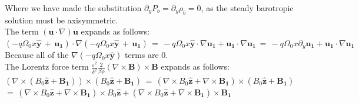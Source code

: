 \documentclass[letterpaper,12pt]{article}
\begin{document}
Where we have made the substitution $\partial_y P_b = \partial_y \rho_b = 0$, as the steady barotropic solution must be axisymmetric. \\

The term $\left(\mathbf{u} \cdot \nabla\right)\mathbf{u}$ expands as follows:\\

$\left(-q \Omega_0 x \mathbf{\hat{y}} \, + \, \mathbf{u_1}\right) \cdot \nabla \left(-q \Omega_0 x \mathbf{\hat{y}} \, + \, \mathbf{u_1}\right) \, = \, - q \Omega_0 x \mathbf{\hat{y}} \cdot \nabla \mathbf{u_1} + \mathbf{u_1} \cdot \nabla \mathbf{u_1} \, = \, - q \Omega_0 x \partial_y \mathbf{u_1} + \mathbf{u_1} \cdot \nabla \mathbf{u_1}$ \\

Because all of the $\nabla \left(-q \Omega_0 x \mathbf{\hat{y}}\right)$ terms are 0. \\






The Lorentz force term $\frac{\varepsilon^2}{\delta^2} \frac{2}{\beta \rho} \left( \nabla \times \mathbf{B} \right) \times \mathbf{B}$ expands as follows: \\

$ \left( \nabla \times \left(B_0 \mathbf{\hat{z}} + \mathbf{B_1}\right) \right) \times \left(B_0 \mathbf{\hat{z}} + \mathbf{B_1}\right) \, = \, \left( \nabla \times B_0 \mathbf{\hat{z}} + \nabla \times \mathbf{B_1} \right) \times \left(B_0 \mathbf{\hat{z}} + \mathbf{B_1}\right) \, $ \\

$= \, \left( \nabla \times B_0 \mathbf{\hat{z}} + \nabla \times \mathbf{B_1} \right) \times B_0 \mathbf{\hat{z}} + \left( \nabla \times B_0 \mathbf{\hat{z}} + \nabla \times \mathbf{B_1} \right) \times \mathbf{B_1} \, $ \\
\end{document}
